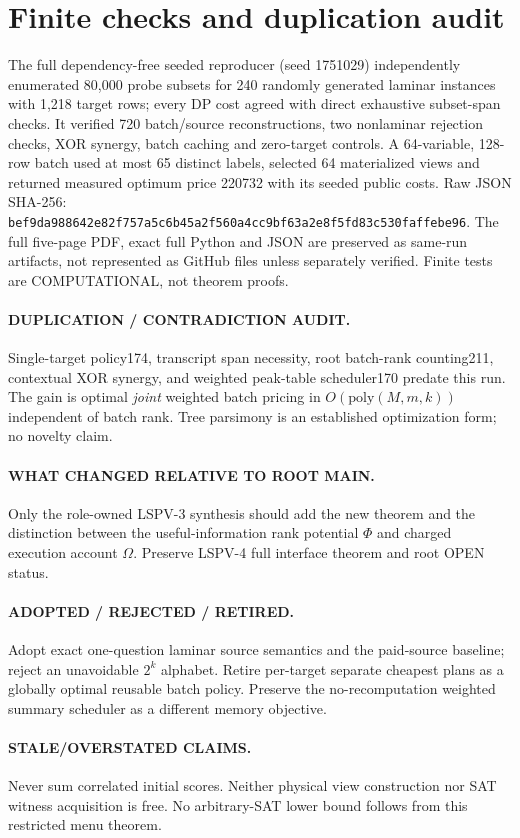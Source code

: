 \documentclass[11pt]{article}
\begin{document}
\section{Finite checks and duplication audit}
The full dependency-free seeded reproducer (seed 1751029) independently enumerated 80,000 probe subsets for 240 randomly generated laminar instances with 1,218 target rows; every DP cost agreed with direct exhaustive subset-span checks. It verified 720 batch/source reconstructions, two nonlaminar rejection checks, XOR synergy, batch caching and zero-target controls. A 64-variable, 128-row batch used at most 65 distinct labels, selected 64 materialized views and returned measured optimum price 220732 with its seeded public costs. Raw JSON SHA-256: \texttt{bef9da988642e82f757a5c6b45a2f560a4cc9bf63a2e8f5fd83c530faffebe96}. The full five-page PDF, exact full Python and JSON are preserved as same-run artifacts, not represented as GitHub files unless separately verified. Finite tests are COMPUTATIONAL, not theorem proofs.

\paragraph{DUPLICATION / CONTRADICTION AUDIT.} Single-target policy174, transcript span necessity, root batch-rank counting211, contextual XOR synergy, and weighted peak-table scheduler170 predate this run. The gain is optimal \emph{joint} weighted batch pricing in $O(\mathrm{poly}(M,m,k))$ independent of batch rank. Tree parsimony is an established optimization form; no novelty claim.
\paragraph{WHAT CHANGED RELATIVE TO ROOT MAIN.} Only the role-owned LSPV-3 synthesis should add the new theorem and the distinction between the useful-information rank potential $\Phi$ and charged execution account $\Omega$. Preserve LSPV-4 full interface theorem and root OPEN status.
\paragraph{ADOPTED / REJECTED / RETIRED.} Adopt exact one-question laminar source semantics and the paid-source baseline; reject an unavoidable $2^k$ alphabet. Retire per-target separate cheapest plans as a globally optimal reusable batch policy. Preserve the no-recomputation weighted summary scheduler as a different memory objective.
\paragraph{STALE/OVERSTATED CLAIMS.} Never sum correlated initial scores. Neither physical view construction nor SAT witness acquisition is free. No arbitrary-SAT lower bound follows from this restricted menu theorem.
\end{document}
